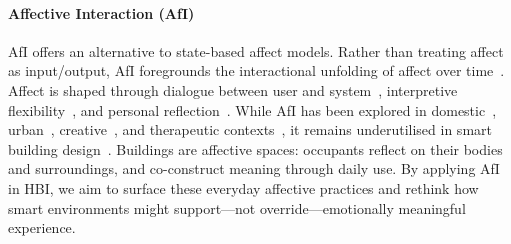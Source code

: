 \paragraph{Affective Interaction (AfI)}
AfI offers an alternative to state-based affect models. Rather than treating affect as input/output, AfI foregrounds the interactional unfolding of affect over time~\cite{lottridge2011affective}. Affect is shaped through dialogue between user and system~\cite{hook2018designing, hook2009affective}, interpretive flexibility~\cite{boehner2005affect, boehner2007emotion}, and personal reflection~\cite{ahmadpour2025affective}. While AfI has been explored in domestic~\cite{angelini2015towards}, urban~\cite{paraschivoiu2022affective},  creative~\cite{huang2025affective}, and therapeutic contexts~\cite{ahmadpour2025affectivevr}, it remains underutilised in smart building design~\cite{rao2025lessons}. Buildings are affective spaces: occupants reflect on their bodies and surroundings, and co-construct meaning through daily use. By applying AfI in HBI, we aim to surface these everyday affective practices and rethink how smart environments might support---not override---emotionally meaningful experience.
